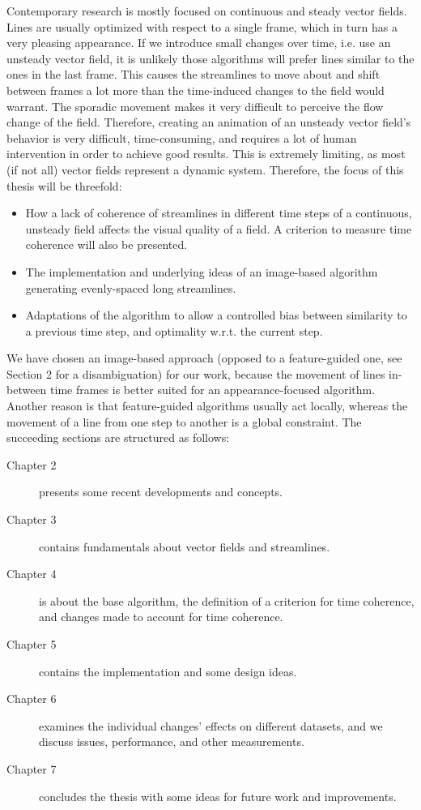 Contemporary research is mostly focused on continuous and steady vector fields.
Lines are usually optimized with respect to a single frame, which in turn has a very pleasing appearance.
If we introduce small changes over time, i.e. use an unsteady vector field, it is unlikely those algorithms will prefer lines similar to the ones in the last frame.
This causes the streamlines to move about and shift between frames a lot more than the time-induced changes to the field would warrant.
The sporadic movement makes it very difficult to perceive the flow change of the field.
Therefore, creating an animation of an unsteady vector field's behavior is very difficult,
time-consuming, and requires a lot of human intervention in order to achieve good results.
This is extremely limiting, as most (if not all) vector fields represent a dynamic system.
Therefore, the focus of this thesis will be threefold:
\begin{itemize}
    \item How a lack of coherence of streamlines in different time steps of a continuous, unsteady field affects the visual quality of a field.
    A criterion to measure time coherence will also be presented.
    \item The implementation and underlying ideas of an image-based algorithm generating evenly-spaced long streamlines.
    \item Adaptations of the algorithm to allow a controlled bias between similarity to a previous time step, and optimality w.r.t. the current step.
\end{itemize}
We have chosen an image-based approach (opposed to a feature-guided one, see Section 2 for a disambiguation) for our work,
because the movement of lines in-between time frames is better suited for an appearance-focused algorithm.
Another reason is that feature-guided algorithms usually act locally, whereas the movement of a line from one step to another
is a global constraint.
The succeeding sections are structured as follows:
\begin{description}
    \item [Chapter 2] presents some recent developments and concepts.
    \item [Chapter 3] contains fundamentals about vector fields and streamlines.
    \item [Chapter 4] is about the base algorithm, the definition of a criterion for time coherence, and changes made to account for time coherence.
    \item [Chapter 5] contains the implementation and some design ideas.
    \item [Chapter 6] examines the individual changes' effects on different datasets, and we discuss issues, performance, and other measurements.
    \item [Chapter 7] concludes the thesis with some ideas for future work and improvements.
\end{description}
